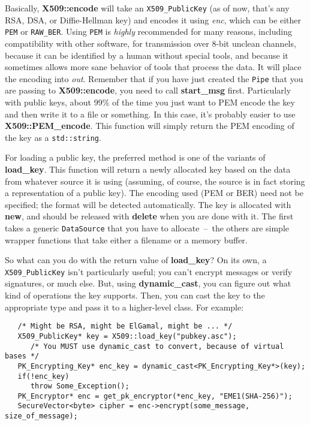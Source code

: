 \documentclass{article}
\newcommand{\function}[1]{\textbf{#1}}
\newcommand{\type}[1]{\texttt{#1}}
\renewcommand{\arg}[1]{\textsl{#1}}
\begin{document}
Basically, \function{X509::encode} will take an \type{X509\_PublicKey}
(as of now, that's any RSA, DSA, or Diffie-Hellman key) and encodes it
using \arg{enc}, which can be either \type{PEM} or
\type{RAW\_BER}. Using \type{PEM} is \emph{highly} recommended for
many reasons, including compatibility with other software, for
transmission over 8-bit unclean channels, because it can be identified
by a human without special tools, and because it sometimes allows more
sane behavior of tools that process the data. It will place the
encoding into \arg{out}. Remember that if you have just created the
\type{Pipe} that you are passing to \function{X509::encode}, you need
to call \function{start\_msg} first. Particularly with public keys,
about 99\% of the time you just want to PEM encode the key and then
write it to a file or something. In this case, it's probably easier to
use \function{X509::PEM\_encode}. This function will simply return the
PEM encoding of the key as a \type{std::string}.

For loading a public key, the preferred method is one of the variants
of \function{load\_key}. This function will return a newly allocated
key based on the data from whatever source it is using (assuming, of
course, the source is in fact storing a representation of a public
key). The encoding used (PEM or BER) need not be specified; the format
will be detected automatically. The key is allocated with
\function{new}, and should be released with \function{delete} when you
are done with it. The first takes a generic \type{DataSource} that
you have to allocate~--~the others are simple wrapper functions that
take either a filename or a memory buffer.

So what can you do with the return value of \function{load\_key}? On
its own, a \type{X509\_PublicKey} isn't particularly useful; you can't
encrypt messages or verify signatures, or much else. But, using
\function{dynamic\_cast}, you can figure out what kind of operations
the key supports. Then, you can cast the key to the appropriate type
and pass it to a higher-level class. For example:

\begin{verbatim}
   /* Might be RSA, might be ElGamal, might be ... */
   X509_PublicKey* key = X509::load_key("pubkey.asc");
      /* You MUST use dynamic_cast to convert, because of virtual bases */
   PK_Encrypting_Key* enc_key = dynamic_cast<PK_Encrypting_Key*>(key);
   if(!enc_key)
      throw Some_Exception();
   PK_Encryptor* enc = get_pk_encryptor(*enc_key, "EME1(SHA-256)");
   SecureVector<byte> cipher = enc->encrypt(some_message, size_of_message);
\end{verbatim}
\end{document}
